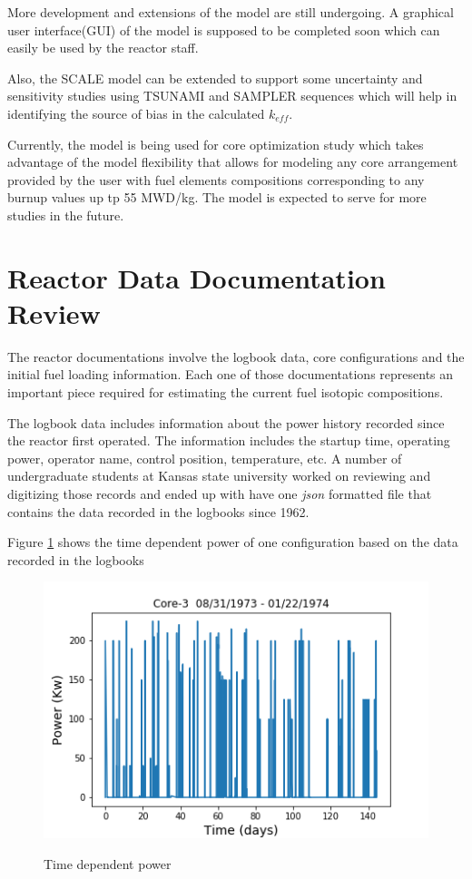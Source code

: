 \documentclass[review,number,sort&compress,12pt]{elsarticle}
\begin{document}
More development and extensions of the model are still undergoing. A graphical user interface(GUI) of the model is supposed to be completed soon which can easily be used by the reactor staff.

Also, the SCALE model can be extended to support some uncertainty and sensitivity studies using TSUNAMI and SAMPLER sequences which will help in identifying the source of bias in the calculated $k_{eff}$.

Currently, the model is being used for core optimization study which takes advantage of the model flexibility that allows for modeling any core arrangement provided by the user with fuel elements compositions corresponding to any burnup values up tp 55 MWD/kg. The model is expected to serve for more studies in the future.

\section{Reactor Data Documentation Review}
The reactor documentations involve the logbook data, core configurations and the initial fuel loading information.
Each one of those documentations represents an important piece required for estimating the current fuel isotopic compositions.

The logbook data includes information about the power history recorded since the reactor first operated. The information includes the startup time, operating power, operator name, control position, temperature, etc.
A number of undergraduate students at Kansas state university worked on reviewing and digitizing those records and ended up with have one \emph{json} formatted file that contains the data recorded in the logbooks since 1962. 

Figure \ref{fig:core3_power} shows the time dependent power of one configuration based on the data recorded in the logbooks

\begin{figure}[h]
\centering
\includegraphics[scale=0.8]{core3.png}\\
\caption{Time dependent power}
\label{fig:core3_power}
\end{figure}
\end{document}
